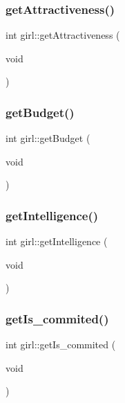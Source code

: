 \subsubsection{\texorpdfstring{get\+Attractiveness()}{getAttractiveness()}}
{\footnotesize\ttfamily int girl\+::get\+Attractiveness (\begin{DoxyParamCaption}\item[{void}]{ }\end{DoxyParamCaption})}

\mbox{\label{classgirl_aff71d37b752b3501114356f862ae91a3}} 
\subsubsection{\texorpdfstring{get\+Budget()}{getBudget()}}
{\footnotesize\ttfamily int girl\+::get\+Budget (\begin{DoxyParamCaption}\item[{void}]{ }\end{DoxyParamCaption})}

\mbox{\label{classgirl_a7cd49c129d9ede212cf24a0d93bfcc6a}} 
\subsubsection{\texorpdfstring{get\+Intelligence()}{getIntelligence()}}
{\footnotesize\ttfamily int girl\+::get\+Intelligence (\begin{DoxyParamCaption}\item[{void}]{ }\end{DoxyParamCaption})}

\mbox{\label{classgirl_aa1565f1f255770e69de297bb631a4ed8}} 
\subsubsection{\texorpdfstring{get\+Is\+\_\+commited()}{getIs\_commited()}}
{\footnotesize\ttfamily int girl\+::get\+Is\+\_\+commited (\begin{DoxyParamCaption}\item[{void}]{ }\end{DoxyParamCaption})}

